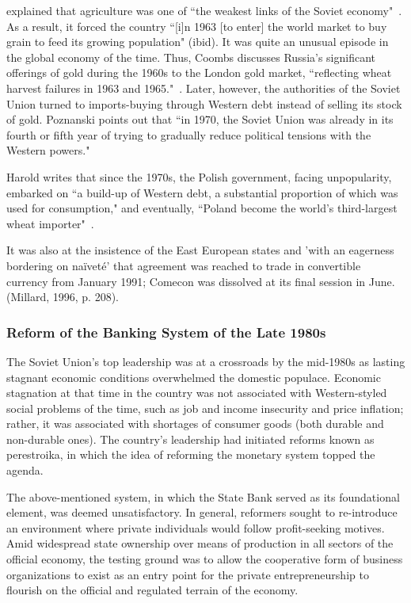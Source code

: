 \citeauthor{dillard1967} explained that agriculture was one of ``the weakest links of the Soviet economy"~\citep[p.~628]{dillard1967}. As a result, it forced the country ``[i]n 1963 [to enter] the world market to buy grain to feed its growing population" (ibid). It was quite an unusual episode in the global economy of the time. Thus, Coombs discusses Russia's significant offerings of gold during the 1960s to the London gold market, ``reflecting wheat harvest failures in 1963 and 1965."~\citep[p.~154]{coombs1976}. Later, however, the authorities of the Soviet Union turned to imports-buying through Western debt instead of selling its stock of gold. Poznanski points out that ``in 1970, the Soviet Union was already in its fourth or fifth year of trying to gradually reduce political tensions with the Western powers."

Harold writes that since the 1970s, the Polish government, facing unpopularity, embarked on ``a build-up of Western debt, a substantial proportion of which was used for consumption," and eventually, ``Poland become the world's third-largest wheat importer"~\citep[pp.~89-90]{harold2003}.

It was also at the insistence of the East European states and 'with an eagerness bordering on na\"{i}vet\'{e}' that agreement was reached to trade in convertible currency from January 1991; Comecon was dissolved at its final session in June. 
(Millard, 1996, p. 208).

\subsubsection{Reform of the Banking System of the Late 1980s}

The Soviet Union's top leadership was at a crossroads by the mid-1980s as lasting stagnant economic conditions overwhelmed the domestic populace. Economic stagnation at that time in the country was not associated with Western-styled social problems of the time, such as job and income insecurity and price inflation; rather, it was associated with shortages of consumer goods (both durable and non-durable ones). The country's leadership had initiated reforms known as perestroika, in which the idea of reforming the monetary system topped the agenda. 

The above-mentioned system, in which the State Bank served as its foundational element, was deemed unsatisfactory. In general, reformers sought to re-introduce an environment where private individuals would follow profit-seeking motives. Amid widespread state ownership over means of production in all sectors of the official economy, the testing ground was to allow the cooperative form of business organizations to exist as an entry point for the private entrepreneurship to flourish on the official and regulated terrain of the economy. 

